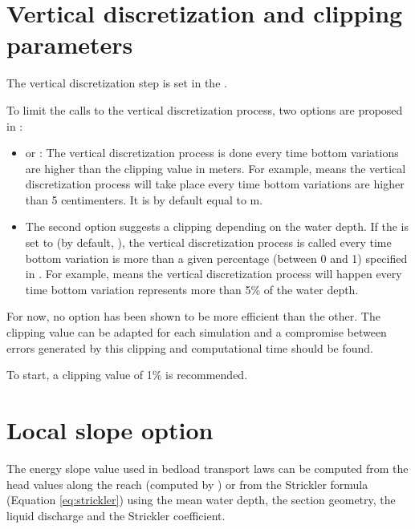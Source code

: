 
\section{Vertical discretization and clipping parameters} \label{planim}
The vertical discretization step is set in the \xcas.

To limit the calls to the vertical discretization process, two options are proposed in \courlis :
\begin{itemize}
	\item {} or  : The vertical discretization process is done every time bottom variations are higher than the clipping value in meters. For example,  means the vertical discretization process will take place every time bottom variations are higher than 5 centimenters. It is by default equal to  m.
	\item The second option suggests a clipping depending on the water depth. If the  is set to  (by default, ), the vertical discretization process is called every time bottom variation is more than a given percentage (between 0 and 1) specified in . For example,  means the vertical discretization process will happen every time bottom variation represents more than 5\% of the water depth.
\end{itemize}
For now, no option has been shown to be more efficient than the other.
The clipping value can be adapted for each simulation and a compromise between errors generated by this clipping and computational time should be found.

To start, a clipping value of 1\% is recommended.

\section{Local slope option} \label{local_slope_opt}

The energy slope value used in bedload transport laws can be computed from the head values along the reach (computed by \mascaret) or from the Strickler formula (Equation \ref{eq:strickler}) using the mean water depth, the section geometry, the liquid discharge and the Strickler coefficient.

